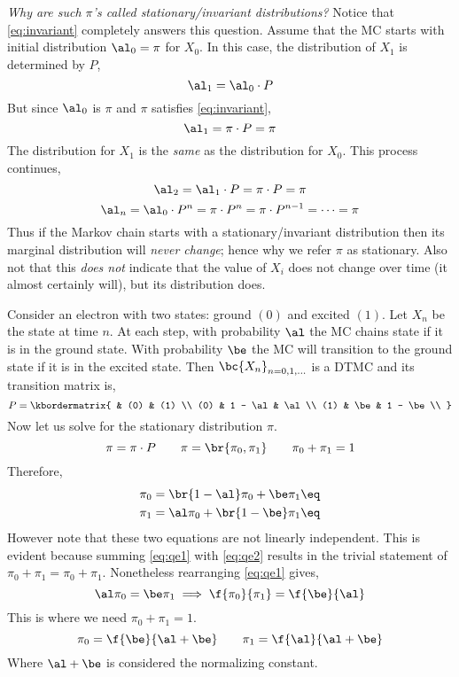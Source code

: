 \documentclass{article}
\begin{document}
\textit{Why are such $\pi$'s called stationary/invariant distributions?} Notice that \cref{eq:invariant} completely answers this question. Assume that the MC starts with initial distribution $\al_0 = \pi$ for $X_0$. In this case, the distribution of $X_1$ is determined by $P$,
\[ \al_1 = \al_0 \cdot P \]
But since $\al_0$ is $\pi$ and $\pi$ satisfies \cref{eq:invariant},
\[ \al_1 = \pi \cdot P = \pi \]
The distribution for $X_1$ is the \textit{same} as the distribution for $X_0$. This process continues,
\[ \al_2 = \al_1 \cdot P = \pi \cdot P = \pi \]
\[ \al_n = \al_0 \cdot P^n = \pi \cdot P^n = \pi \cdot P^{n-1} = \cdots = \pi \]
Thus if the Markov chain starts with a stationary/invariant distribution then its marginal distribution will \textit{never change}; hence why we refer $\pi$ as stationary. Also not that this \textit{does not} indicate that the value of $X_i$ does not change over time (it almost certainly will), but its distribution does.

\begin{example}
    Consider an electron with two states: ground $(0)$ and excited $(1)$. Let $X_n$ be the state at time $n$. At each step, with probability $\al$ the MC chains state if it is in the ground state. With probability $\be$ the MC will transition to the ground state if it is in the excited state. Then $\bc{X_n}_{n=0,1,\ldots}$ is a DTMC and its transition matrix is,
    \[ P = \kbordermatrix{
         & (0) & (1) \\
        (0) & 1 - \al & \al \\
        (1) & \be & 1 - \be \\
    } \]
    Now let us solve for the stationary distribution $\pi$.
    \[ \pi = \pi \cdot P \qquad \pi = \br{\pi_0, \pi_1} \qquad \pi_0 + \pi_1 = 1 \]
    Therefore,
    \begin{align*}
    \pi_0 &= \br{1 - \al} \pi_0 + \be \pi_1 \eq \label{eq:qe1}\\
    \pi_1 &= \al \pi_0 + \br{1 - \be} \pi_1 \eq \label{eq:qe2}
    \end{align*}
    However note that these two equations are not linearly independent. This is evident because summing \cref{eq:qe1} with \cref{eq:qe2} results in the trivial statement of $\pi_0 + \pi_1 = \pi_0 + \pi_1$. Nonetheless rearranging \cref{eq:qe1} gives,
    \[ \al \pi_0 = \be \pi_1 \implies \f{\pi_0}{\pi_1} = \f{\be}{\al} \]
    This is where we need $\pi_0 + \pi_1 = 1$.
    \[ \pi_0 = \f{\be}{\al+\be} \qquad \pi_1 = \f{\al}{\al+\be} \]
    Where $\al + \be$ is considered the normalizing constant.
\end{example}
\end{document}
